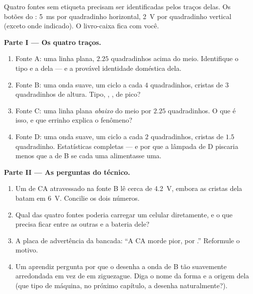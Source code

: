 \begin{problem}\label{pb:g9:alternating-current:1}
Quatro fontes sem etiqueta precisam ser identificadas pelos traços
delas. Os botões do : \qty{5}{ms} por quadradinho
horizontal, \qty{2}{V} por quadradinho vertical (exceto onde
indicado). O livro-caixa fica com você.

\medskip\noindent\textbf{Parte I --- Os quatro traços.}
\begin{enumerate}
  \item Fonte A: uma linha plana, $2.25$ quadradinhos acima do meio.
        Identifique o tipo e a  dela --- e a provável identidade
        doméstica dela.
  \item Fonte B: uma onda suave, um ciclo a cada $4$ quadradinhos,
        cristas de $3$ quadradinhos de altura. Tipo, ,
        ,  de pico?
  \item Fonte C: uma linha plana \emph{abaixo} do meio por $2.25$
        quadradinhos. O que é isso, e que errinho explica o
        fenômeno?
  \item Fonte D: uma onda suave, um ciclo a cada $2$ quadradinhos,
        cristas de $1.5$ quadradinho. Estatísticas completas --- e por
        que a lâmpada de D piscaria menos que a de B se cada uma
        alimentasse uma.
\end{enumerate}

\medskip\noindent\textbf{Parte II --- As perguntas do técnico.}
\begin{enumerate}[resume]
  \item Um  de CA atravessado na fonte B lê cerca de
        \qty{4.2}{V}, embora as cristas dela batam em \qty{6}{V}.
        Concilie os dois números.
  \item Qual das quatro fontes poderia carregar um celular
        diretamente, e o que precisa ficar entre as outras e a
        bateria dele?
  \item A placa de advertência da bancada: ``A CA morde pior, 
        por .'' Reformule o motivo.
  \item Um aprendiz pergunta por que o  desenha a onda de
        B tão suavemente arredondada em vez de em ziguezague. Diga o
        nome da forma e a origem dela (que tipo de máquina, no
        próximo capítulo, a desenha naturalmente?).
\end{enumerate}


\end{problem}
